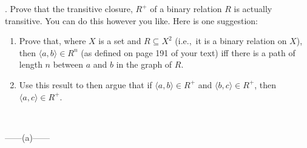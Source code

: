 \documentclass[12pt]{article}
\begin{document}
\newpage
{}. Prove that the transitive closure, $R^+$ of a binary relation $R$ is actually 
transitive. You can do this however you like. Here is one suggestion:
\begin{enumerate}
\renewcommand{\labelenumi}{\alph{enumi}.}
\item Prove that, where $X$ is a set and $R \subseteq X^2$ (i.e.,\ it is a binary 
relation on $X$), then $\langle a,b \rangle \in R^n$ (as defined on page 191 of 
your text) iff there is a path of length $n$ between $a$ and $b$ in the graph of 
$R$. 
\item Use this result to then argue that if $\langle a,b\rangle \in R^+$ and 
$\langle b,c\rangle \in R^+$, then $\langle a,c\rangle \in R^+$.
\end{enumerate}
~~~
\begin{center}
    ------(a)------
\end{center}
\end{document}
